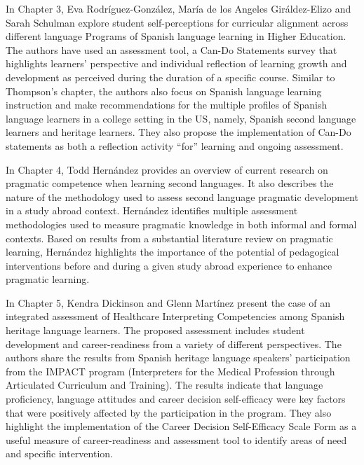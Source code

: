 \documentclass[output=paper]{langscibook}
\begin{document}
In Chapter 3, Eva Rodríguez-González, María de los Angeles Giráldez-Elizo and Sarah Schulman explore student self-perceptions for curricular alignment across different language Programs of Spanish language learning in Higher Education. The authors have used an assessment tool, a Can-Do Statements survey that highlights learners’ perspective and individual reflection of learning growth and development as perceived during the duration of a specific course. Similar to Thompson’s chapter, the authors also focus on Spanish language learning instruction and make recommendations for the multiple profiles of Spanish language learners in a college setting in the US, namely, Spanish second language learners and heritage learners. They also propose the implementation of Can-Do statements as both a reflection activity “for” learning and ongoing assessment.



In Chapter 4, Todd Hernández provides an overview of current research on pragmatic competence when learning second languages. It also describes the nature of the methodology used to assess second language pragmatic development in a study abroad context. Hernández identifies multiple assessment methodologies used to measure pragmatic knowledge in both informal and formal contexts. Based on results from a substantial literature review on pragmatic learning, Hernández highlights the importance of the potential of pedagogical interventions before and during a given study abroad experience to enhance pragmatic learning.



In Chapter 5, Kendra Dickinson and Glenn Martínez present the case of an integrated assessment of Healthcare Interpreting Competencies among Spanish heritage language learners. The proposed assessment includes student development and career-readiness from a variety of different perspectives. The authors share the results from Spanish heritage language speakers’ participation from the IMPACT program (Interpreters for the Medical Profession through Articulated Curriculum and Training). The results indicate that language proficiency, language attitudes and career decision self-efficacy were key factors that were positively affected by the participation in the program. They also highlight the implementation of the Career Decision Self-Efficacy Scale Form as a useful measure of career-readiness and assessment tool to identify areas of need and specific intervention.
\end{document}
